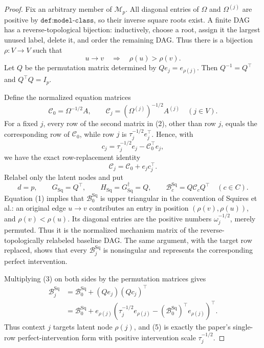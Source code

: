 \documentclass{article}
\begin{document}
\begin{proof}
Fix an arbitrary member of \(\mathcal M_p\).  All diagonal entries of
\(\Omega\) and \(\Omega^{(j)}\) are positive by
\(\texttt{def:model-class}\), so their inverse square roots exist.  A
finite DAG has a reverse-topological bijection: inductively, choose a root,
assign it the largest unused label, delete it, and order the remaining DAG.
Thus there is a bijection \(\rho:V\to V\) such that
\[
 u\to v\quad\Longrightarrow\quad \rho(u)>\rho(v).                 \tag{1}
\]
Let \(Q\) be the permutation matrix determined by
\(Qe_j=e_{\rho(j)}\).  Then
\(Q^{-1}=Q^{\top}\) and \(Q^{\top}Q=I_p\).

Define the normalized equation matrices
\[
 \mathcal C_0=\Omega^{-1/2}A,
 \qquad
 \mathcal C_j=(\Omega^{(j)})^{-1/2}A^{(j)}
 \quad(j\in V).                                                  \tag{2}
\]
For a fixed \(j\), every row of the second matrix in (2), other than row
\(j\), equals the corresponding row of \(\mathcal C_0\), while row
\(j\) is \(\tau_j^{-1/2}e_j^{\top}\).  Hence, with
\[
 c_j=\tau_j^{-1/2}e_j-\mathcal C_0^{\top}e_j,
\]
we have the exact row-replacement identity
\[
 \mathcal C_j=\mathcal C_0+e_jc_j^{\top}.                         \tag{3}
\]
Relabel only the latent nodes and put
\[
 d=p,
 \qquad
 G_{\mathrm{Sq}}=Q^{\top},
 \qquad
 H_{\mathrm{Sq}}=G_{\mathrm{Sq}}^{\dagger}=Q,
 \qquad
 \mathcal B_c^{\mathrm{Sq}}=Q\mathcal C_cQ^{\top}
 \quad(c\in C).                                                  \tag{4}
\]
Equation (1) implies that \(\mathcal B_0^{\mathrm{Sq}}\) is upper
triangular in the convention of Squires et al.: an original edge
\(u\to v\) contributes an entry in position
\((\rho(v),\rho(u))\), and \(\rho(v)<\rho(u)\).  Its diagonal entries
are the positive numbers \(\omega_j^{-1/2}\), merely permuted.  Thus it
is the normalized mechanism matrix of the reverse-topologically relabeled
baseline DAG.  The same argument, with the target row replaced, shows
that every \(\mathcal B_j^{\mathrm{Sq}}\) is nonsingular and represents
the corresponding perfect intervention.

Multiplying (3) on both sides by the permutation matrices gives
\[
 \begin{aligned}
 \mathcal B_j^{\mathrm{Sq}}
 &=\mathcal B_0^{\mathrm{Sq}}+(Qe_j)(Qc_j)^{\top}\\
 &=\mathcal B_0^{\mathrm{Sq}}+e_{\rho(j)}
 \left(\tau_j^{-1/2}e_{\rho(j)}
       -(\mathcal B_0^{\mathrm{Sq}})^{\top}e_{\rho(j)}\right)^{\top}.
                                                                    \tag{5}
 \end{aligned}
\]
Thus context \(j\) targets latent node \(\rho(j)\), and (5) is exactly
the paper's single-row perfect-intervention form with positive intervention
scale \(\tau_j^{-1/2}\).


\end{proof}
\end{document}
